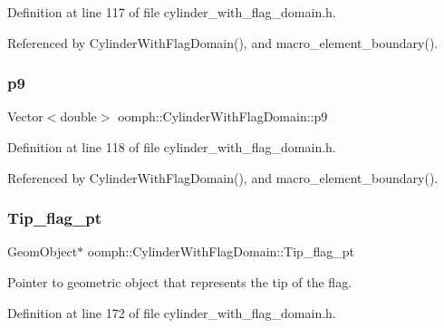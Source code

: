 Definition at line 117 of file cylinder\+\_\+with\+\_\+flag\+\_\+domain.\+h.



Referenced by Cylinder\+With\+Flag\+Domain(), and macro\+\_\+element\+\_\+boundary().

\mbox{\label{classoomph_1_1CylinderWithFlagDomain_a8ff949c600451d8cc9e53fc9b204dd79}} 
\subsubsection{\texorpdfstring{p9}{p9}}
{\footnotesize\ttfamily Vector$<$double$>$ oomph\+::\+Cylinder\+With\+Flag\+Domain\+::p9\hspace{0.3cm}{\ttfamily [private]}}



Definition at line 118 of file cylinder\+\_\+with\+\_\+flag\+\_\+domain.\+h.



Referenced by Cylinder\+With\+Flag\+Domain(), and macro\+\_\+element\+\_\+boundary().

\mbox{\label{classoomph_1_1CylinderWithFlagDomain_a2926eb3a4c171fbc924115f7dfd211a4}} 
\subsubsection{\texorpdfstring{Tip\+\_\+flag\+\_\+pt}{Tip\_flag\_pt}}
{\footnotesize\ttfamily Geom\+Object$\ast$ oomph\+::\+Cylinder\+With\+Flag\+Domain\+::\+Tip\+\_\+flag\+\_\+pt\hspace{0.3cm}{\ttfamily [private]}}



Pointer to geometric object that represents the tip of the flag. 



Definition at line 172 of file cylinder\+\_\+with\+\_\+flag\+\_\+domain.\+h.




